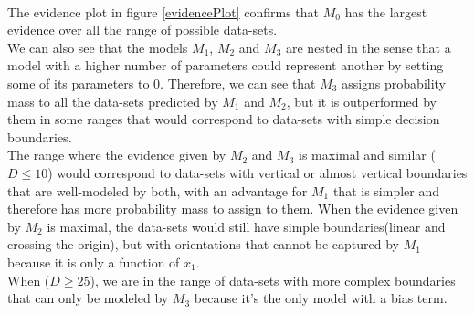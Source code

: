 \documentclass[a4paper,11pt]{article}
\theoremstyle{mytheor}
\begin{document}
\smallskip
\\The evidence plot in figure \ref{evidencePlot} confirms that $M_0$ has the largest evidence over all the range of possible data-sets. \\
We can also see that the models $M_1$, $M_2$ and $M_3$ are nested in the sense that a model with a higher number of parameters could represent another by setting some of its parameters to 0. Therefore, we can see that $M_3$ assigns probability mass to all the data-sets predicted by $M_1$ and $M_2$, but it is outperformed by them in some ranges that would correspond to data-sets with simple decision boundaries.\\
The range where the evidence given by $M_2$ and $M_3$ is maximal and similar ($D \leq 10$) would correspond to data-sets with vertical or almost vertical boundaries that are well-modeled by both, with an advantage for $M_1$ that is simpler and therefore has more probability mass to assign to them. When the evidence given by $M_2$ is maximal, the data-sets would still have simple boundaries(linear and crossing the origin), but with orientations that cannot be captured by $M_1$ because it is only a function of $x_1$.\\
When ($D \geq 25$), we are in the range of data-sets with more complex boundaries that can only be modeled by $M_3$ because it's the only model with a bias term.
\smallskip\\\\
\end{document}
